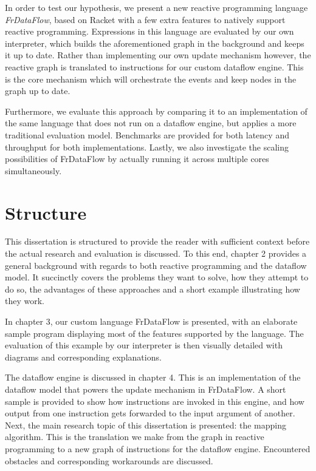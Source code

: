 In order to test our hypothesis, we present a new reactive programming language \textit{FrDataFlow}, based on Racket with a few extra features to natively support reactive programming. Expressions in this language are evaluated by our own interpreter, which builds the aforementioned graph in the background and keeps it up to date. Rather than implementing our own update mechanism however, the reactive graph is translated to instructions for our custom dataflow engine. This is the core mechanism which will orchestrate the events and keep nodes in the graph up to date.

Furthermore, we evaluate this approach by comparing it to an implementation of the same language that does not run on a dataflow engine, but applies a more traditional evaluation model. Benchmarks are provided for both latency and throughput for both implementations. Lastly, we also investigate the scaling possibilities of FrDataFlow by actually running it across multiple cores simultaneously. 

\section{Structure}

This dissertation is structured to provide the reader with sufficient context before the actual research and evaluation is discussed. To this end, chapter 2 provides a general background with regards to both reactive programming and the dataflow model. It succinctly covers the problems they want to solve, how they attempt to do so, the advantages of these approaches and a short example illustrating how they work.

In chapter 3, our custom language FrDataFlow is presented, with an elaborate sample program displaying most of the features supported by the language. The evaluation of this example by our interpreter is then visually detailed with diagrams and corresponding explanations. 

The dataflow engine is discussed in chapter 4. This is an implementation of the dataflow model that powers the update mechanism in FrDataFlow. A short sample is provided to show how instructions are invoked in this engine, and how output from one instruction gets forwarded to the input argument of another. Next, the main research topic of this dissertation is presented: the mapping algorithm. This is the translation we make from the graph in reactive programming to a new graph of instructions for the dataflow engine. Encountered obstacles and corresponding workarounds are discussed.

